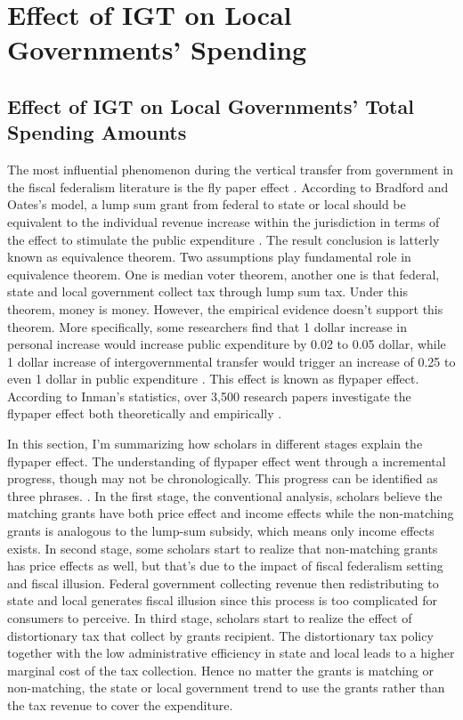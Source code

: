 \section{Effect of IGT on Local Governments' Spending}

\subsection{Effect of IGT on Local Governments' Total Spending Amounts}
The most influential phenomenon during the vertical transfer from government in the fiscal federalism literature is the fly paper effect \cite{hines1995anomalies,gamkhar2007impact}. According to Bradford and Oates’s model, a lump sum grant from federal to state or local should be equivalent to the individual revenue increase within the jurisdiction in terms of the effect to stimulate the public expenditure \cite{bradford1971analysis}. The result conclusion is latterly known as equivalence theorem. Two assumptions play fundamental role in equivalence theorem. One is median voter theorem, another one is that federal, state and local government collect tax through lump sum tax. Under this theorem, money is money. However, the empirical evidence doesn’t support this theorem. More specifically, some researchers find that 1 dollar increase in personal increase would increase public expenditure by 0.02 to 0.05 dollar, while 1 dollar increase of intergovernmental transfer would trigger an increase of 0.25 to even 1 dollar in public expenditure \cite{bailey1998flypaper,dollery1996empirical,gamkhar2007impact}. This effect is known as flypaper effect. According to Inman's statistics, over 3,500 research papers investigate the flypaper effect both theoretically and empirically \cite{inman2008flypaper}.

In this section, I’m summarizing how scholars in different stages explain the flypaper effect. The understanding of flypaper effect went through a incremental progress, though may not be chronologically. This progress can be identified as three phrases. . In the first stage, the conventional analysis, scholars believe the matching grants have both price effect and income effects while the non-matching grants is analogous to the lump-sum subsidy, which means only income effects exists. In second stage, some scholars start to realize that non-matching grants has price effects as well, but that’s due to the impact of fiscal federalism setting and fiscal illusion. Federal government collecting revenue then redistributing to state and local generates fiscal illusion since this process is too complicated for consumers to perceive. In third stage, scholars start to realize the effect of distortionary tax that collect by grants recipient. The distortionary tax policy together with the low administrative efficiency in state and local leads to a higher marginal cost of the tax collection. Hence no matter the grants is matching or non-matching, the state or local government trend to use the grants rather than the tax revenue to cover the expenditure.

